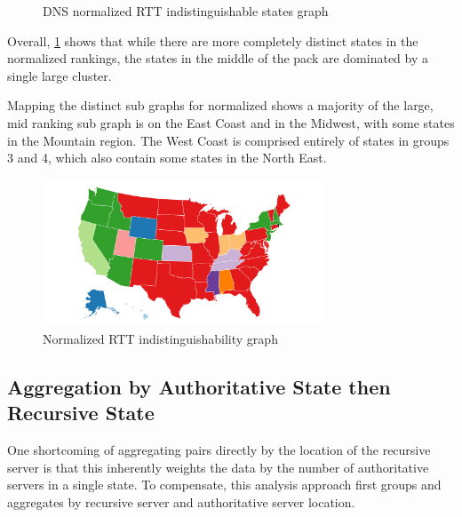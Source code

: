 \begin{figure}
    \centering
    
    \caption{DNS normalized RTT indistinguishable states graph}
    \label{fig:dns_normalized_rtt_indistinguishable_states_graph}
\end{figure}

Overall, \cref{fig:dns_normalized_rtt_indistinguishable_states_graph} shows that while there are more completely distinct states in the normalized rankings, the states in the middle of the pack are dominated by a single large cluster.

Mapping the distinct sub graphs for normalized \dns \rtt shows a majority of the large, mid ranking sub graph is on the East Coast and in the Midwest, with some states in the Mountain region. The West Coast is comprised entirely of states in groups 3 and 4, which also contain some states in the North East.

\begin{figure}[htb]
    \centering
    \includegraphics[width=0.75\textwidth]{images/dns/analysis_no_auth_agg/rtt_normalized/no_auth_distinct_norm_rtt_map.png}
    \caption{Normalized RTT indistinguishability graph}
    \label{fig:dns_normalized_rtt_indistinguishable_states_map}
\end{figure}

\subsection{Aggregation by Authoritative State then Recursive State}

One shortcoming of aggregating pairs directly by the location of the recursive server is that this inherently weights the data by the number of authoritative servers in a single state. To compensate, this analysis approach first groups and aggregates by recursive server and authoritative server location. 

